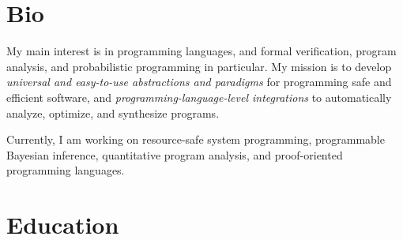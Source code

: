 \documentclass[11pt,letterpaper,sans]{moderncv}        %
\begin{document}
\makecvtitle


\section{Bio}
%
My main interest is in programming languages, and formal verification, program analysis, and probabilistic programming in particular.
%
My mission is to develop \emph{universal and easy-to-use abstractions and paradigms} for programming safe and efficient software, and \emph{programming-language-level integrations} to automatically analyze, optimize, and synthesize programs.


Currently, I am working on resource-safe system programming, programmable Bayesian inference, quantitative program analysis, and proof-oriented programming languages.

\section{Education}

  {}

  \vspace{4pt}

  {}
\end{document}
